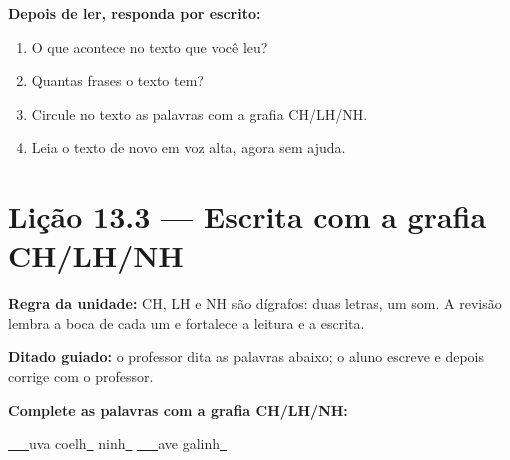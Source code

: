 \textbf{Depois de ler, responda por escrito:}
\begin{enumerate}

  \item O que acontece no texto que você leu?
  \begin{center}
  \underline{\hspace{12cm}}
  \end{center}

  \item Quantas frases o texto tem?
  \begin{center}
  \underline{\hspace{12cm}}
  \end{center}

  \item Circule no texto as palavras com a grafia CH/LH/NH.

  \item Leia o texto de novo em voz alta, agora sem ajuda.

\end{enumerate}

\section{Lição 13.3 --- Escrita com a grafia CH/LH/NH}

\noindent\textbf{Regra da unidade:} CH, LH e NH são dígrafos: duas letras, um som. A revisão lembra a boca de cada um e fortalece a leitura e a escrita.


\noindent\textbf{Ditado guiado:} o professor dita as palavras abaixo; o aluno escreve e depois corrige com o professor.

\begin{center}
  \underline{\hspace{2.3cm}} \quad \underline{\hspace{2.3cm}} \quad \underline{\hspace{2.3cm}} \quad \underline{\hspace{2.3cm}}

  \underline{\hspace{2.3cm}} \quad \underline{\hspace{2.3cm}} \quad \underline{\hspace{2.3cm}} \quad \underline{\hspace{2.3cm}}
\end{center}

\noindent\textbf{Complete as palavras com a grafia CH/LH/NH:}
\begin{center}
  \underline{~~~}uva \quad coelh\underline{~} \quad ninh\underline{~} \quad \underline{~~~}ave \quad galinh\underline{~}
\end{center}

